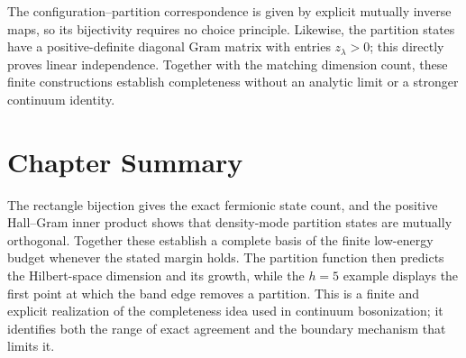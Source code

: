 \begin{remark}
The configuration--partition correspondence is given by explicit mutually
inverse maps, so its bijectivity requires no choice principle. Likewise,
the partition states have a positive-definite diagonal Gram matrix with
entries $z_\lambda>0$; this directly proves linear independence. Together
with the matching dimension count, these finite constructions establish
completeness without an analytic limit or a stronger continuum identity.
\end{remark}

\section{Chapter Summary}
The rectangle bijection gives the exact fermionic state count, and the
positive Hall--Gram inner product shows that density-mode partition states
are mutually orthogonal. Together these establish a complete basis of the
finite low-energy budget whenever the stated margin holds. The partition
function then predicts the Hilbert-space dimension and its growth, while
the $h=5$ example displays the first point at which the band edge removes a
partition. This is a finite and explicit realization of the completeness
idea used in continuum bosonization; it identifies both the range of exact
agreement and the boundary mechanism that limits it.
